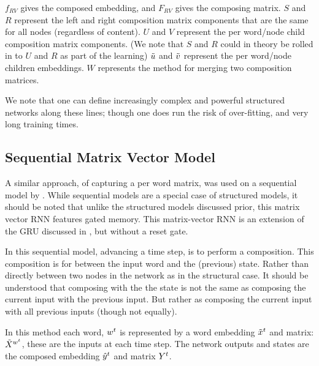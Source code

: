 \documentclass[12pt,parskip]{komatufte}
\begin{document}
$f_{RV}$ gives the composed embedding, and $F_{RV}$ gives the composing matrix.
$S$ and $R$ represent the left and right composition matrix components that are the same for all nodes (regardless of content).
$U$ and $V$ represent the per word/node child composition matrix components.
(We note that $S$ and $R$ could in theory be rolled in to $U$ and $R$ as part of the learning)
$\tilde{u}$ and $\tilde{v}$ represent the per word/node children embeddings.
$W$ represents the method for merging two composition matrices.

We note that one can define increasingly complex and powerful structured networks along these lines; though one does run the risk of over-fitting, and very long training times.

\subsection{Sequential Matrix Vector Model}
A similar approach, of capturing a per word matrix, 
was used on a sequential model by .
While sequential models are a special case of structured models,
it should be noted that unlike the structured models discussed prior,
this matrix vector RNN features gated memory.
This matrix-vector RNN is an extension of the GRU discussed in , but without a reset gate.


In this sequential model, advancing a time step, is to perform a composition.
This composition is for between the input word and the (previous) state.
Rather than directly between two nodes in the network as in the structural case.
It should be understood that composing with the the state is not the same as composing the current input with the previous input.
But rather as composing the current input with all previous inputs (though not equally).

In this method each word, $\n w_t$ is represented by a word embedding $\nv x_{t}$ and matrix: $\nv X_{\n w_t}$, these are the inputs at each time step.
The network outputs and states are the composed embedding $\n \hat{y}_t$ and matrix $\n Y_t$.


 
\end{document}
